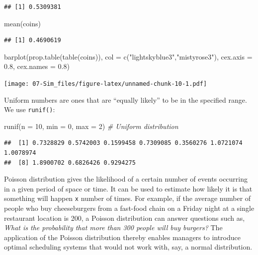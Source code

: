 \documentclass[
]{book}
\newenvironment{Shaded}{\begin{snugshade}}{\end{snugshade}}
\newcommand{\AttributeTok}[1]{\textcolor[rgb]{0.77,0.63,0.00}{#1}}
\newcommand{\CommentTok}[1]{\textcolor[rgb]{0.56,0.35,0.01}{\textit{#1}}}
\newcommand{\DecValTok}[1]{\textcolor[rgb]{0.00,0.00,0.81}{#1}}
\newcommand{\FloatTok}[1]{\textcolor[rgb]{0.00,0.00,0.81}{#1}}
\newcommand{\FunctionTok}[1]{\textcolor[rgb]{0.00,0.00,0.00}{#1}}
\newcommand{\NormalTok}[1]{#1}
\newcommand{\StringTok}[1]{\textcolor[rgb]{0.31,0.60,0.02}{#1}}
\begin{document}
\begin{verbatim}
## [1] 0.5309381
\end{verbatim}

\begin{Shaded}
\begin{Highlighting}[]
\FunctionTok{mean}\NormalTok{(coins)}
\end{Highlighting}
\end{Shaded}

\begin{verbatim}
## [1] 0.4690619
\end{verbatim}

\begin{Shaded}
\begin{Highlighting}[]
\FunctionTok{barplot}\NormalTok{(}\FunctionTok{prop.table}\NormalTok{(}\FunctionTok{table}\NormalTok{(coins)),}
        \AttributeTok{col =} \FunctionTok{c}\NormalTok{(}\StringTok{"lightskyblue3"}\NormalTok{,}\StringTok{"mistyrose3"}\NormalTok{),}
        \AttributeTok{cex.axis =} \FloatTok{0.8}\NormalTok{, }\AttributeTok{cex.names =} \FloatTok{0.8}\NormalTok{)}
\end{Highlighting}
\end{Shaded}

\texttt{[image: 07-Sim\_files/figure-latex/unnamed-chunk-10-1.pdf]}

Uniform numbers are ones that are ``equally likely'' to be in the specified range. We use \texttt{runif()}:

\begin{Shaded}
\begin{Highlighting}[]
\FunctionTok{runif}\NormalTok{(}\AttributeTok{n =} \DecValTok{10}\NormalTok{, }\AttributeTok{min =} \DecValTok{0}\NormalTok{, }\AttributeTok{max =} \DecValTok{2}\NormalTok{) }\CommentTok{\# Uniform distribution}
\end{Highlighting}
\end{Shaded}

\begin{verbatim}
##  [1] 0.7328829 0.5742003 0.1599458 0.7309085 0.3560276 1.0721074 1.0078974
##  [8] 1.8900702 0.6826426 0.9294275
\end{verbatim}

Poisson distribution gives the likelihood of a certain number of events occurring in a given period of space or time. It can be used to estimate how likely it is that something will happen \texttt{x} number of times. For example, if the average number of people who buy cheeseburgers from a fast-food chain on a Friday night at a single restaurant location is 200, a Poisson distribution can answer questions such as, \emph{What is the probability that more than 300 people will buy burgers?} The application of the Poisson distribution thereby enables managers to introduce optimal scheduling systems that would not work with, say, a normal distribution.
\end{document}
